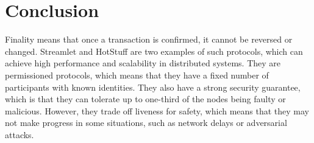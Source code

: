 \documentclass{report}
\begin{document}
\section*{Conclusion}
Finality means that once a transaction is confirmed, it cannot be reversed or changed. Streamlet and HotStuff are two examples of such protocols, which can achieve high performance and scalability in distributed systems. They are permissioned protocols, which means that they have a fixed number of participants with known identities. They also have a strong security guarantee, which is that they can tolerate up to one-third of the nodes being faulty or malicious. However, they trade off liveness for safety, which means that they may not make progress in some situations, such as network delays or adversarial attacks.
\end{document}
